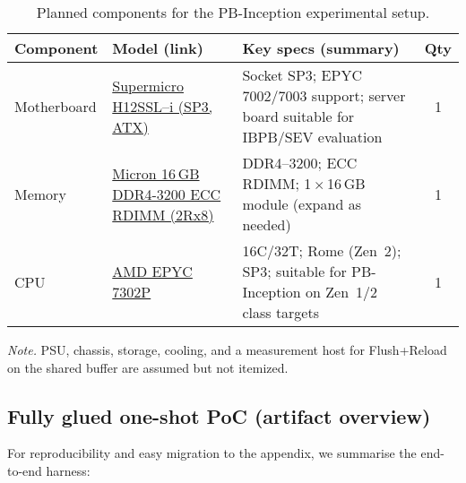 \documentclass[11pt,a4paper]{article}
\begin{document}
\setlength{\tabcolsep}{6pt}
\renewcommand{\arraystretch}{1.15}
\begin{table}[t]
  \centering
  \caption{Planned components for the PB-Inception experimental setup.}
  \label{tab:pbinc-components}
  \begin{tabularx}{\linewidth}{@{} l Y Y c @{}}
    \toprule
    \textbf{Component} & \textbf{Model (link)} & \textbf{Key specs (summary)} & \textbf{Qty} \\
    \midrule
    Motherboard &
      \href{https://www.digitec.ch/de/s1/product/supermicro-h12ssl-i-sp3-amd-soc-atx-mainboard-13904801}
           {Supermicro H12SSL--i (SP3, ATX)} &
      Socket SP3; EPYC 7002/7003 support; server board suitable for IBPB/SEV evaluation & 1 \\
    Memory &
      \href{https://www.digitec.ch/de/s1/product/micron-16gb-ddr4-3200-2rx8-ecc-rdimm-1-x-16gb-3200-mhz-ddr4-ram-dimm-ram-21164557}
           {Micron 16\,GB DDR4-3200 ECC RDIMM (2Rx8)} &
      DDR4--3200; ECC RDIMM; 1\,$\times$\,16\,GB module (expand as needed) & 1 \\
    CPU &
      \href{https://www.galaxus.ch/de/s1/product/amd-epyc-7302p-sp3-3-ghz-16-core-prozessor-13259327}
           {AMD EPYC 7302P} &
      16C/32T; Rome (Zen~2); SP3; suitable for PB-Inception on Zen~1/2 class targets & 1 \\
    \bottomrule
  \end{tabularx}

  \vspace{0.4em}
  \footnotesize\emph{Note.} PSU, chassis, storage, cooling, and a measurement host for Flush+Reload on the shared buffer are assumed but not itemized.
\end{table}

\subsection{Fully glued one-shot PoC (artifact overview)}
For reproducibility and easy migration to the appendix, we summarise the end-to-end harness:
\end{document}
